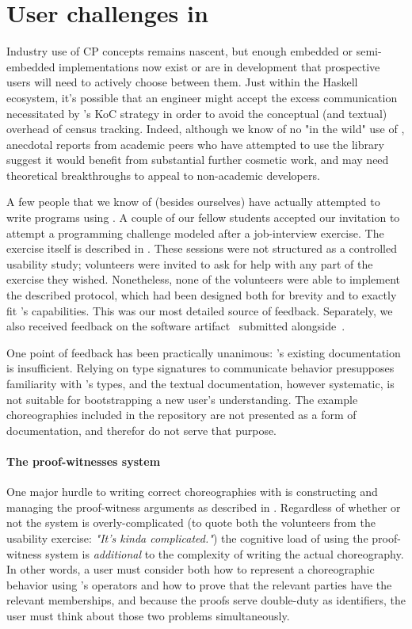 \section{User challenges in \MultiChor}
\label{sec:usability}

Industry use of CP concepts remains nascent,
but enough embedded or semi-embedded implementations now exist or are in development that prospective users
will need to actively choose between them.
Just within the Haskell ecosystem, it's possible that an engineer might accept the excess communication necessitated by \HasChor's
KoC strategy in order to avoid the conceptual (and textual) overhead of census tracking.
Indeed, although we know of no "in the wild" use of \MultiChor,
anecdotal reports from academic peers who have attempted to use the library suggest it would benefit from substantial further cosmetic work,
and may need theoretical breakthroughs to appeal to non-academic developers.

A few people that we know of (besides ourselves) have actually attempted to write programs using \MultiChor.
A couple of our fellow students accepted our invitation to attempt a programming challenge modeled after a job-interview exercise.
The exercise itself is described in .
These sessions were not structured as a controlled usability study;
volunteers were invited to ask for help with any part of the exercise they wished.
Nonetheless, none of the volunteers were able to implement the described protocol,
which had been designed both for brevity and to exactly fit \MultiChor's capabilities.
This was our most detailed source of feedback.
Separately, 
we also received feedback on the software artifact~\cite{ourArtifact} submitted alongside~\cite{batesenclaves}.

One point of feedback has been practically unanimous:
\MultiChor's existing documentation is insufficient.
Relying on type signatures to communicate behavior presupposes familiarity with \MultiChor's types,
and the textual documentation, however systematic, is not suitable for bootstrapping a new user's understanding.
The example choreographies included in the \MultiChor repository are not presented as a form of documentation, 
and therefor do not serve that purpose.

\paragraph{The proof-witnesses system}
One major hurdle to writing correct choreographies with \MultiChor is constructing and managing the proof-witness arguments
as described in .
Regardless of whether or not the system is overly-complicated
(to quote both the volunteers from the usability exercise:
\emph{"It's kinda complicated."})
the cognitive load of using the proof-witness system is \emph{additional} to
the complexity of writing the actual choreography.
In other words,
a user must consider both how to represent a choreographic behavior using \MultiChor's operators
and how to prove that the relevant parties have the relevant memberships,
and because the proofs serve double-duty as identifiers, the user must think about those two problems simultaneously.

